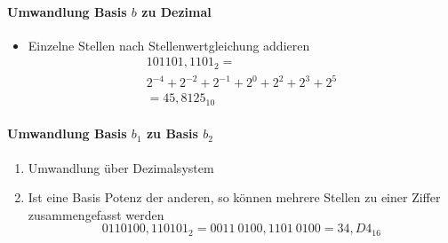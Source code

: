 \paragraph{Umwandlung Basis $b$ zu Dezimal}
\begin{itemize}
	\item Einzelne Stellen nach Stellenwertgleichung addieren
	\begin{multline*}
		101101,1101_2 = \\ 2^{-4}+2^{-2}+2^{-1}+2^0+2^2+2^3+2^5 \\ = 45,8125_{10}
	\end{multline*}
\end{itemize}

\paragraph{Umwandlung Basis $b_1$ zu Basis $b_2$}
\begin{enumerate}
	\item Umwandlung über Dezimalsystem
	\item Ist eine Basis Potenz der anderen, so können mehrere Stellen zu einer Ziffer zusammengefasst werden
	\begin{equation*}
		0110100,110101_2 = 0011 \ 0100,1101 \ 0100 = 34,D4_{16}
	\end{equation*}
\end{enumerate}

